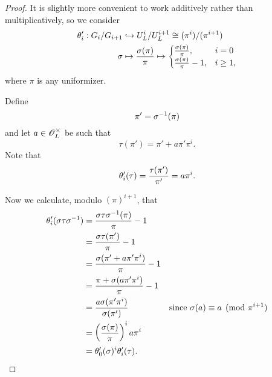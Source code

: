 \begin{proof}
It is slightly more convenient to work additively rather than multiplicatively, so we consider
\begin{align*}
\theta_i':G_i/G_{i+1}&\hookrightarrow U_L^i/U_L^{i+1}\cong (\pi^i)/(\pi^{i+1})\\
\sigma&\mapsto \frac{\sigma(\pi)}{\pi} \mapsto 
\begin{cases}
\frac{\sigma(\pi)}{\pi},& i=0\\
\frac{\sigma(\pi)}{\pi}-1,& i\ge 1,
\end{cases}
\end{align*}
where $\pi$ is any uniformizer.

%
Define 
\[
\pi'=\sigma^{-1}(\pi)
\]
and let $a\in \mathscr{O}_L^{\times}$ be such that
\[
\tau(\pi')=\pi'+a\pi'\pi^i.
\]
Note that
\[
\theta_i'(\tau)=\frac{\tau(\pi')}{\pi'}=a\pi^i.
\]

Now we calculate, modulo $(\pi)^{i+1}$, that
\begin{align*}
\theta_i'(\sigma\tau\sigma^{-1})
&=\frac{\sigma\tau\sigma^{-1}(\pi)}{\pi}-1\\
&=\frac{\sigma\tau(\pi')}{\pi}-1\\
&=\frac{\sigma(\pi'+a\pi'\pi^i)}{\pi}-1\\
&=\frac{\pi+\sigma(a\pi'\pi^i)}{\pi}-1\\
&=\frac{a\sigma(\pi'\pi^i)}{\sigma(\pi')}&\text{since }\sigma(a)\equiv a\pmod{\pi^{i+1}}\\
&=\left( {\frac{\sigma(\pi)}{\pi}} \right)^ia\pi^i\\
&=\theta_0'(\sigma)^i\theta_i'(\tau).&\qedhere
\end{align*}
\end{proof}
